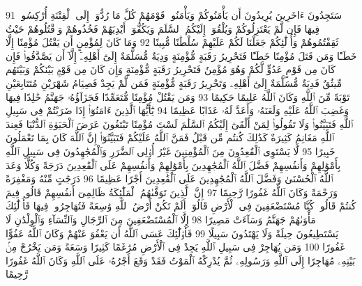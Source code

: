 {\tiny\colorbox{cl_aya}{91}} سَتَجِدُونَ ءَاخَرِينَ يُرِيدُونَ أَن يَأْمَنُوكُمْ وَيَأْمَنُوا۟ قَوْمَهُمْ كُلَّ مَا رُدُّوٓا۟ إِلَى ٱلْفِتْنَةِ أُرْكِسُوا۟ فِيهَا فَإِن لَّمْ يَعْتَزِلُوكُمْ وَيُلْقُوٓا۟ إِلَيْكُمُ ٱلسَّلَمَ وَيَكُفُّوٓا۟ أَيْدِيَهُمْ فَخُذُوهُمْ وَٱقْتُلُوهُمْ حَيْثُ ثَقِفْتُمُوهُمْ وَأُو۟لَٰٓئِكُمْ جَعَلْنَا لَكُمْ عَلَيْهِمْ سُلْطَٰنًا مُّبِينًا
{\tiny\colorbox{cl_aya}{92}} وَمَا كَانَ لِمُؤْمِنٍ أَن يَقْتُلَ مُؤْمِنًا إِلَّا خَطَـًٔا وَمَن قَتَلَ مُؤْمِنًا خَطَـًٔا فَتَحْرِيرُ رَقَبَةٍ مُّؤْمِنَةٍ وَدِيَةٌ مُّسَلَّمَةٌ إِلَىٰٓ أَهْلِهِۦٓ إِلَّآ أَن يَصَّدَّقُوا۟ فَإِن كَانَ مِن قَوْمٍ عَدُوٍّ لَّكُمْ وَهُوَ مُؤْمِنٌ فَتَحْرِيرُ رَقَبَةٍ مُّؤْمِنَةٍ وَإِن كَانَ مِن قَوْمٍۭ بَيْنَكُمْ وَبَيْنَهُم مِّيثَٰقٌ فَدِيَةٌ مُّسَلَّمَةٌ إِلَىٰٓ أَهْلِهِۦ وَتَحْرِيرُ رَقَبَةٍ مُّؤْمِنَةٍ فَمَن لَّمْ يَجِدْ فَصِيَامُ شَهْرَيْنِ مُتَتَابِعَيْنِ تَوْبَةً مِّنَ ٱللَّهِ وَكَانَ ٱللَّهُ عَلِيمًا حَكِيمًا
{\tiny\colorbox{cl_aya}{93}} وَمَن يَقْتُلْ مُؤْمِنًا مُّتَعَمِّدًا فَجَزَآؤُهُۥ جَهَنَّمُ خَٰلِدًا فِيهَا وَغَضِبَ ٱللَّهُ عَلَيْهِ وَلَعَنَهُۥ وَأَعَدَّ لَهُۥ عَذَابًا عَظِيمًا
{\tiny\colorbox{cl_aya}{94}} يَٰٓأَيُّهَا ٱلَّذِينَ ءَامَنُوٓا۟ إِذَا ضَرَبْتُمْ فِى سَبِيلِ ٱللَّهِ فَتَبَيَّنُوا۟ وَلَا تَقُولُوا۟ لِمَنْ أَلْقَىٰٓ إِلَيْكُمُ ٱلسَّلَٰمَ لَسْتَ مُؤْمِنًا تَبْتَغُونَ عَرَضَ ٱلْحَيَوٰةِ ٱلدُّنْيَا فَعِندَ ٱللَّهِ مَغَانِمُ كَثِيرَةٌ كَذَٰلِكَ كُنتُم مِّن قَبْلُ فَمَنَّ ٱللَّهُ عَلَيْكُمْ فَتَبَيَّنُوٓا۟ إِنَّ ٱللَّهَ كَانَ بِمَا تَعْمَلُونَ خَبِيرًا
{\tiny\colorbox{cl_aya}{95}} لَّا يَسْتَوِى ٱلْقَٰعِدُونَ مِنَ ٱلْمُؤْمِنِينَ غَيْرُ أُو۟لِى ٱلضَّرَرِ وَٱلْمُجَٰهِدُونَ فِى سَبِيلِ ٱللَّهِ بِأَمْوَٰلِهِمْ وَأَنفُسِهِمْ فَضَّلَ ٱللَّهُ ٱلْمُجَٰهِدِينَ بِأَمْوَٰلِهِمْ وَأَنفُسِهِمْ عَلَى ٱلْقَٰعِدِينَ دَرَجَةً وَكُلًّا وَعَدَ ٱللَّهُ ٱلْحُسْنَىٰ وَفَضَّلَ ٱللَّهُ ٱلْمُجَٰهِدِينَ عَلَى ٱلْقَٰعِدِينَ أَجْرًا عَظِيمًا
{\tiny\colorbox{cl_aya}{96}} دَرَجَٰتٍ مِّنْهُ وَمَغْفِرَةً وَرَحْمَةً وَكَانَ ٱللَّهُ غَفُورًا رَّحِيمًا
{\tiny\colorbox{cl_aya}{97}} إِنَّ ٱلَّذِينَ تَوَفَّىٰهُمُ ٱلْمَلَٰٓئِكَةُ ظَالِمِىٓ أَنفُسِهِمْ قَالُوا۟ فِيمَ كُنتُمْ قَالُوا۟ كُنَّا مُسْتَضْعَفِينَ فِى ٱلْأَرْضِ قَالُوٓا۟ أَلَمْ تَكُنْ أَرْضُ ٱللَّهِ وَٰسِعَةً فَتُهَاجِرُوا۟ فِيهَا فَأُو۟لَٰٓئِكَ مَأْوَىٰهُمْ جَهَنَّمُ وَسَآءَتْ مَصِيرًا
{\tiny\colorbox{cl_aya}{98}} إِلَّا ٱلْمُسْتَضْعَفِينَ مِنَ ٱلرِّجَالِ وَٱلنِّسَآءِ وَٱلْوِلْدَٰنِ لَا يَسْتَطِيعُونَ حِيلَةً وَلَا يَهْتَدُونَ سَبِيلًا
{\tiny\colorbox{cl_aya}{99}} فَأُو۟لَٰٓئِكَ عَسَى ٱللَّهُ أَن يَعْفُوَ عَنْهُمْ وَكَانَ ٱللَّهُ عَفُوًّا غَفُورًا
{\tiny\colorbox{cl_aya}{100}} وَمَن يُهَاجِرْ فِى سَبِيلِ ٱللَّهِ يَجِدْ فِى ٱلْأَرْضِ مُرَٰغَمًا كَثِيرًا وَسَعَةً وَمَن يَخْرُجْ مِنۢ بَيْتِهِۦ مُهَاجِرًا إِلَى ٱللَّهِ وَرَسُولِهِۦ ثُمَّ يُدْرِكْهُ ٱلْمَوْتُ فَقَدْ وَقَعَ أَجْرُهُۥ عَلَى ٱللَّهِ وَكَانَ ٱللَّهُ غَفُورًا رَّحِيمًا

